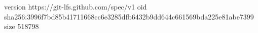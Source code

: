 version https://git-lfs.github.com/spec/v1
oid sha256:3996f7bd85b41711668cc6e3285dfb6432b9dd644c661569bda225e81abe7399
size 518798
